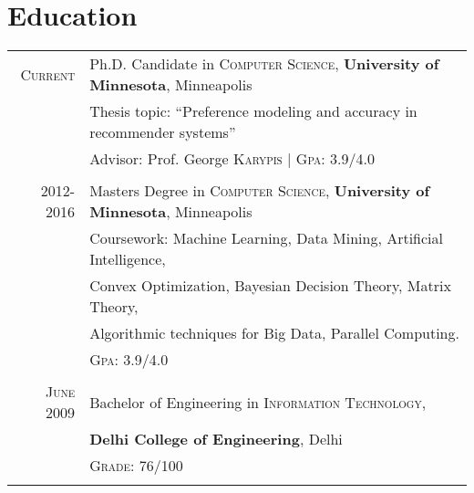 \documentclass[a4paper,10pt]{article}
\begin{document}
\section{Education}
\begin{tabular}{r|l}	
 \textsc{Current}  & Ph.D. Candidate in \textsc{Computer Science},
  \textbf{University of Minnesota}, Minneapolis\\
 & Thesis topic: ``Preference modeling and accuracy in
  recommender systems''\\
  & \small Advisor: Prof. George
  \textsc{Karypis} | \normalsize \textsc{Gpa}: 3.9/4.0  \\\multicolumn{2}{c}{}\\

  \textsc{2012-2016} & Masters Degree in \textsc{Computer Science},
  \textbf{University of Minnesota}, Minneapolis \\
                     &Coursework: Machine Learning, Data Mining, Artificial
  Intelligence,  \\
                   &Convex Optimization, Bayesian Decision Theory, Matrix
  Theory, \\ 
  &Algorithmic techniques for Big Data, Parallel Computing. \\
                     &\normalsize \textsc{Gpa}: 3.9/4.0 \\
                   \multicolumn{2}{c}{}\\ %

   
   \textsc{June} 2009& Bachelor of Engineering in \textsc{Information
      Technology}, \\
      &\textbf{Delhi College of Engineering}, Delhi\\
&\textsc{Grade}: 76/100\\ %
\multicolumn{2}{c}{}\\
\end{tabular}
\end{document}
